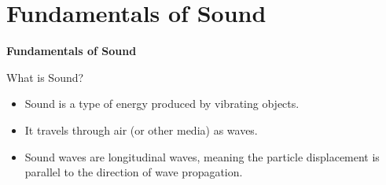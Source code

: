 \section{Fundamentals of Sound}
\begin{frame}{}
    \LARGE \textbf{Fundamentals of Sound}
\end{frame}

\begin{frame}{What is Sound?}
    \begin{figure}
        \centering
    \end{figure}
    \begin{itemize}
        \item Sound is a type of energy produced by vibrating objects.
        \item It travels through air (or other media) as waves.
        \item Sound waves are longitudinal waves, meaning the particle displacement is parallel to the direction of wave propagation.
    \end{itemize}
\end{frame}

